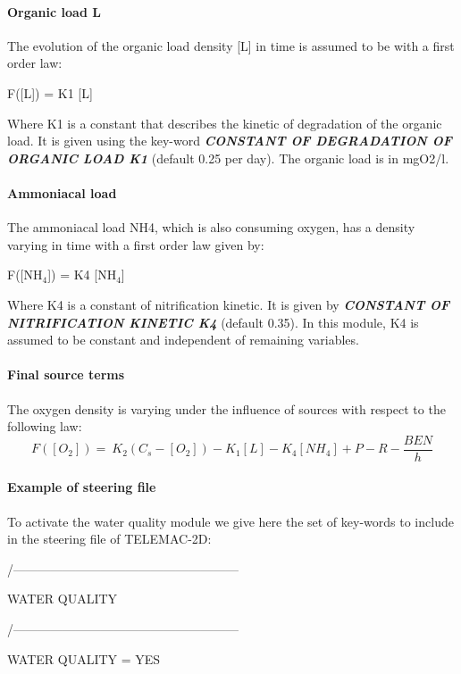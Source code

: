 \paragraph{  Organic load L}

 The evolution of the organic load density [L] in time is assumed to be with a first order law:

 F([L]) = K1 [L]

 Where K1 is a constant that describes the kinetic of degradation of the organic load. It is given using the key-word \textbf{\textit{CONSTANT OF DEGRADATION OF ORGANIC LOAD K1}} (default 0.25 per day).  The organic load is in mgO2/l.


\paragraph{ Ammoniacal load}

 The ammoniacal load NH4, which is also consuming oxygen, has a density varying in time with a first order law given by:

 F([NH${}_{4}$]) = K4 [NH${}_{4}$]

 Where K4 is a constant of nitrification kinetic. It is given by \textbf{\textit{CONSTANT OF NITRIFICATION KINETIC K4}}\textit{ }(default 0.35). In this module, K4 is assumed to be constant and independent of remaining variables.


\paragraph{ Final source terms}

 The oxygen density is varying under the influence of sources with respect to the following law:
\[F\left([O_2]\right)=\ K_2\left(C_s-[O_2]\right)-K_1\left[L\right]-K_4\left[NH_4\right]+P-R-\frac{BEN}{h}\]


\paragraph{ Example of steering file}

 To activate the water quality module we give here the set of key-words to include in the steering file of TELEMAC-2D:

 /------------------------------------------------------

   WATER QUALITY

 /------------------------------------------------------

 WATER QUALITY           = YES

